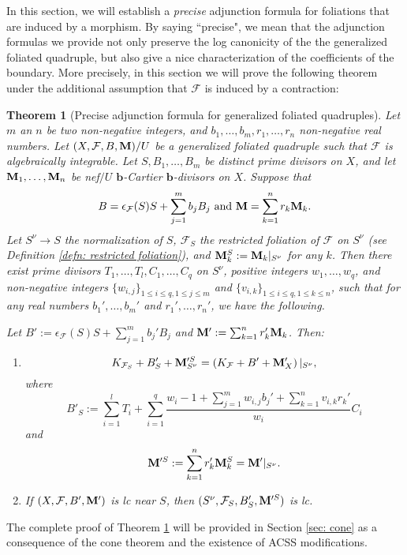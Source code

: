 \documentclass[11pt]{amsart}
\numberwithin{equation}{section}
\newcommand{\bb}{\bm{b}}
\newcommand{\Mm}{{\bf{M}}}
\newcommand{\Ff}{\mathcal{F}}
\newtheorem{thm}{Theorem}[subsection]
\theoremstyle{definition}
\theoremstyle{definition}
\theoremstyle{definition}
\begin{document}
In this section, we will establish a \emph{precise} adjunction formula for foliations that are induced by a morphism. By saying ``precise", we mean that the adjunction formulas we provide not only preserve the log canonicity of the the generalized foliated quadruple, but also give a nice characterization of the coefficients of the boundary. More precisely, in this section we will prove the following theorem under the additional assumption that $\Ff$ is induced by a contraction:


\begin{thm}[Precise adjunction formula for generalized foliated quadruples]\label{thm: precise adj gfq}
Let $m$ an $n$ be two non-negative integers, and $b_1,\dots,b_m,r_1,\dots,r_n$ non-negative real numbers. Let $(X,\Ff,B,\Mm)/U$ be a generalized foliated quadruple such that $\Ff$ is algebraically integrable. Let $S,B_1,\dots,B_m$ be distinct prime divisors on $X$, and let $\Mm_1,\dots,\Mm_n$ be nef$/U$ $\bb$-Cartier $\bb$-divisors on $X$. Suppose that
$$B=\epsilon_{\Ff}(S)S+\sum_{j=1}^mb_jB_j\text{ and }\Mm=\sum_{k=1}^n r_k\Mm_k.$$
Let $S^\nu\rightarrow S$ the normalization of $S$, $\Ff_S$ the restricted foliation of $\Ff$ on $S^\nu$ (see Definition \ref{defn: restricted foliation}), and $\Mm_{k}^S:=\Mm_k|_{S^\nu}$ for any $k$. Then there exist prime divisors $T_1,\dots,T_l,C_1,\dots,C_q$ on $S^\nu$, positive integers $w_1,\dots,w_q$, and non-negative integers $\{w_{i,j}\}_{1\leq i\leq q,1\leq j\leq m}$ and $\{v_{i,k}\}_{1\leq i\leq q, 1\leq k\leq n}$, such that for any  real numbers $b_1',\dots,b_m'$ and $r_1',\dots,r_n'$, we have the following. 

Let $B':=\epsilon_{\Ff}(S)S+\sum_{j=1}^mb_j'B_j$ and $\Mm':=\sum_{k=1}^nr_k'\Mm_{k}$. Then:
\begin{enumerate}
    \item $$K_{\Ff_S}+B'_{S}+\Mm'^{S}_{S^\nu}=\left(K_\Ff+B'+\Mm'_X\right)|_{S^\nu},$$
    where 
    $$B'_{S}:=\sum_{i=1}^lT_i+\sum_{i=1}^q\frac{w_i-1+\sum_{j=1}^mw_{i,j}b_j'+\sum_{k=1}^nv_{i,k}r_k'}{w_i}C_i$$
and
$$\Mm'^{S}:=\sum_{k=1}^nr_k'\Mm_k^S=\Mm'|_{S^\nu}.$$
\item If $(X,\Ff,B',\Mm')$ is lc near $S$, then $(S^\nu,\Ff_S,B'_{S},\Mm'^{S})$ is lc.
\end{enumerate}
\end{thm}

The complete proof of Theorem \ref{thm: precise adj gfq} will be provided in Section \ref{sec: cone} as a consequence of the cone theorem and the existence of ACSS modifications.
\end{document}
